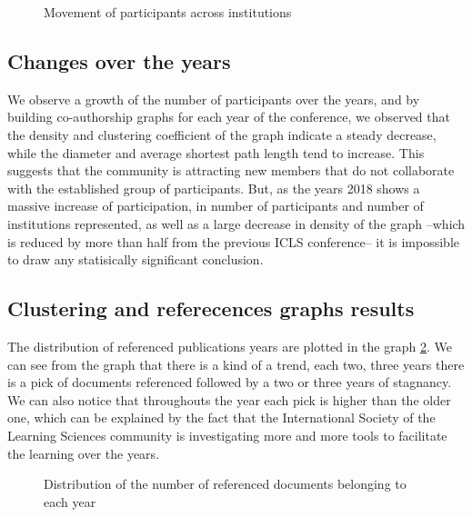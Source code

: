 \documentclass[article,twocolumn]{IEEEtran}
\begin{document}
    \begin{figure}
        \begin{center}\end{center}
        \caption{Movement of participants across institutions}
        \label{fig_move}
    \end{figure}
    
    \hypertarget{changes-over-the-years}{%
\subsection{Changes over the years}\label{changes-over-the-years}}

We observe a growth of the number of participants over the years, and by
building co-authorship graphs for each year of the conference, we
observed that the density and clustering coefficient of the graph
indicate a steady decrease, while the diameter and average shortest path
length tend to increase. This suggests that the community is attracting
new members that do not collaborate with the established group of
participants. But, as the years 2018 shows a massive increase of
participation, in number of participants and number of institutions
represented, as well as a large decrease in density of the graph --which
is reduced by more than half from the previous ICLS conference-- it is
impossible to draw any statisically significant conclusion.

    \hypertarget{clustering-and-referecences-graphs-results}{%
\subsection{Clustering and referecences graphs
results}\label{clustering-and-referecences-graphs-results}}

The distribution of referenced publications years are plotted in the
graph \ref{count_ref_docs}. We can see from the graph that there is a
kind of a trend, each two, three years there is a pick of documents
referenced followed by a two or three years of stagnancy. We can also
notice that throughouts the year each pick is higher than the older one,
which can be explained by the fact that the International Society of the
Learning Sciences community is investigating more and more tools to
facilitate the learning over the years.


    \begin{figure}
        \begin{center}\end{center}
        \caption{Distribution of the number of referenced documents belonging to each year}
        \label{count_ref_docs}
    \end{figure}
    
\end{document}
